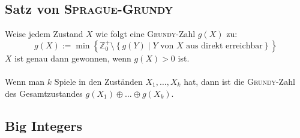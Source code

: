 \subsection{Satz von \textsc{Sprague-Grundy}}
Weise jedem Zustand $X$ wie folgt eine \textsc{Grundy}-Zahl $g\left(X\right)$ zu:
\[
	g\left(X\right) := \min\left\{
		\mathbb{Z}_0^+ \setminus
		\left\{g\left(Y\right) \mid Y \text{ von } X \text{ aus direkt erreichbar}\right\}
	\right\} 
\]
$X$ ist genau dann gewonnen, wenn $g\left(X\right) > 0$ ist.\\\\
Wenn man $k$ Spiele in den Zuständen $X_1, \ldots, X_k$ hat, dann ist die \textsc{Grundy}-Zahl des Gesamtzustandes $g\left(X_1\right) \oplus \ldots \oplus g\left(X_k\right)$.

\subsection{Big Integers}

